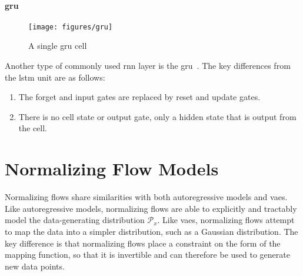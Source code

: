 \paragraph{\gls{gru}}


\begin{figure}
	\begin{center}
		\texttt{[image: figures/gru]}
	\end{center}
	\caption{A single \gls{gru} cell}\label{fig:gru}
\end{figure}

Another type of commonly used \gls{rnn} layer is the \gls{gru}~.
The key differences from the \gls{lstm} unit are as follows:

\begin{enumerate}
	\item The forget and input gates are replaced by reset and update gates.
	\item There is no cell state or output gate, only a hidden state that is output from the cell.
\end{enumerate}


\section{Normalizing Flow Models}

Normalizing flows share similarities with both autoregressive models and \glspl{vae}.
Like autoregressive models, normalizing flows are able to explicitly and tractably model the data-generating distribution \(\mathcal{P}_{x}\).
Like \glspl{vae}, normalizing flows attempt to map the data into a simpler distribution, such as a Gaussian distribution.
The key difference is that normalizing flows place a constraint on the form of the mapping function, so that it is invertible and can therefore be used to generate new data points.

